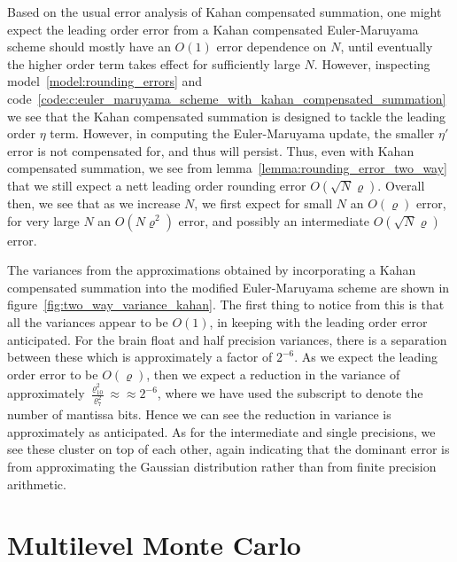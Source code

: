 \documentclass[9pt,a4paper,english]{extarticle}
\begin{document}
Based on the usual error analysis of Kahan compensated summation, one might expect the leading order error from a Kahan compensated Euler-Maruyama scheme should mostly have an $ O(1) $ error dependence on $ N $, until eventually the higher order term takes effect for sufficiently large $ N $. However, inspecting model~\ref{model:rounding_errors} and code~\ref{code:c:euler_maruyama_scheme_with_kahan_compensated_summation} we see that the Kahan compensated summation is designed to tackle the leading order $ \eta $ term. However, in computing the Euler-Maruyama update, the smaller $ \eta' $ error is not compensated for, and thus will persist. Thus, even with Kahan compensated summation, we see from lemma~\ref{lemma:rounding_error_two_way} that we still expect a nett leading order rounding error $ O(\sqrt{N}\varrho) $. Overall then, we see that as we increase $ N $, we first expect for small $ N $ an $ O(\varrho) $ error, for very large $ N $ an $ O(N\varrho^2) $ error, and possibly an intermediate $ O(\sqrt{N}\varrho) $ error. 

The variances from the approximations obtained by incorporating a Kahan compensated summation into the modified Euler-Maruyama scheme are shown in figure~\ref{fig:two_way_variance_kahan}. The first thing to notice from this is that all the variances appear to be $ O(1) $, in keeping with the leading order error anticipated. For the brain float and half precision variances, there is a separation between these which is approximately a factor of $ 2^{-6} $. As we expect the leading order error to be $ O(\varrho) $, then we expect a reduction in the variance of approximately $ \tfrac{\varrho^2_{10}}{\varrho^2_{7}} \approx \approx 2^{-6} $, where we have used the subscript to denote the number of mantissa bits. Hence we can see the reduction in variance is approximately as anticipated. As for the intermediate and single precisions, we see these cluster on top of each other, again indicating that the dominant error is from approximating the Gaussian distribution rather than from finite precision arithmetic. 

\section{Multilevel Monte Carlo}
\label{sec:multilevel_monte_carlo}
\end{document}
